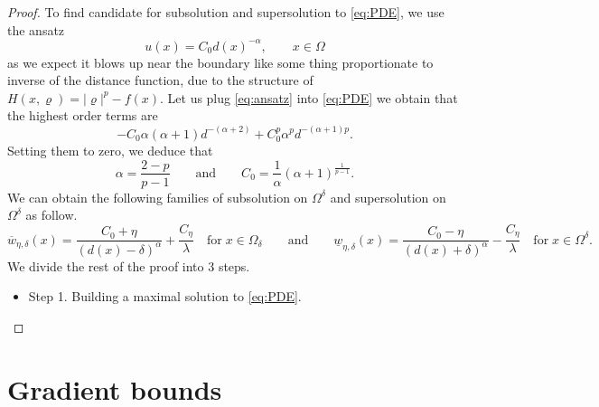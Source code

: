 \documentclass[11pt,reqno]{amsart}
\numberwithin{figure}{section}
\theoremstyle{plain}
\theoremstyle{remark}
\numberwithin{equation}{section}
\begin{document}
\begin{appendices}
\begin{proof}
\noindent To find candidate for subsolution and supersolution to \eqref{eq:PDE}, we use the ansatz
\begin{equation}\label{eq:ansatz}
    u(x) = C_0 d(x)^{-\alpha}, \qquad x\in \Omega
\end{equation}
as we expect it blows up near the boundary like some thing proportionate to inverse of the distance function, due to the structure of $H(x,\varrho) = |\varrho|^p - f(x)$. Let us plug \eqref{eq:ansatz} into \eqref{eq:PDE} we obtain that the highest order terms are
\begin{equation*}
        -C_0 \alpha(\alpha+1)d^{-(\alpha+2)} + C_0^p \alpha^p d^{-(\alpha+1)p}.
\end{equation*}
Setting them to zero, we deduce that
\begin{equation*}
    \displaystyle\alpha = \frac{2-p}{p-1} \qquad\text{and}\qquad C_0 = \frac{1}{\alpha}(\alpha+1)^\frac{1}{p-1}.
\end{equation*}
We can obtain the following families of subsolution on $\Omega^\delta$ and supersolution on $\Omega^\delta$ as follow.
\begin{equation*}
        \overline{w}_{\eta,\delta}(x) = \frac{C_0+\eta}{(d(x)-\delta)^\alpha} +\frac{C_\eta}{\lambda} \quad\text{for}\;x\in \Omega_\delta \qquad\text{and}\qquad \underline{w}_{\eta,\delta}(x) = \frac{C_0-\eta}{(d(x)+\delta)^\alpha} -\frac{C_\eta}{\lambda} \quad\text{for}\;x\in \Omega^\delta.
\end{equation*}
We divide the rest of the proof into 3 steps.
\begin{itemize}
    \item Step 1. Building a maximal solution to \eqref{eq:PDE}. 
\end{itemize}
\end{proof}




\section{Gradient bounds}

\end{appendices}
\end{document}
